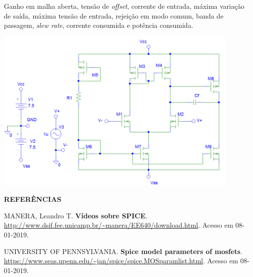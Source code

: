 \documentclass[addpoints]{exam}
\begin{document}
\begin{questions}
Ganho em malha aberta, tensão de\textit{ offset}, corrente de entrada, máxima variação de saída, máxima tensão de entrada, rejeição em modo comum, banda de passagem,\textit{ slew rate}, corrente consumida e potência consumida.



\begin{center}
\includegraphics[width=0.9\textwidth]{imagens/1.png}
\end{center}



\vspace{5mm}

\textbf{REFERÊNCIAS}

\vspace{5mm}

MANERA, Leandro T. \textbf{Vídeos sobre SPICE}. \url{http://www.dsif.fee.unicamp.br/~manera/EE640/download.html}. Acesso em 08-01-2019.

UNIVERSITY OF PENNSYLVANIA. \textbf{Spice model parameters of mosfets}. \url{https://www.seas.upenn.edu/~jan/spice/spice.MOSparamlist.html}. Acesso em 08-01-2019.

\end{questions}
\end{document}
